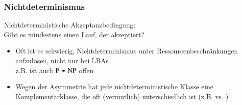 \documentclass[aspectratio=1610,onlymath]{beamer}
\begin{document}
\begin{frame}\frametitle{Nichtdeterminismus}

\alert{Nichtdeterministische Akzeptanzbedingung:}
\\Gibt es mindestens einen Lauf, der akzeptiert?\\
\bigskip

\bigskip

\begin{itemize}
\item Oft ist es schwierig, Nichtdeterminismus unter Ressourcenbeschränkungen aufzulösen, nicht nur bei LBAs\\
z.B. ist auch ${\textsc{P}}\neq{\textsc{NP}}$ offen
\item Wegen der Asymmetrie hat jede nichtdeterministische Klasse eine Komplementärklasse, die oft (vermutlich) unterschiedlich ist (z.B.  vs. )
\end{itemize}

\end{frame}
\end{document}
